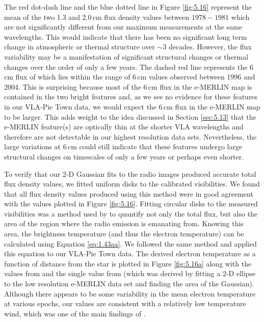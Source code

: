 The red dot-dash line and the blue dotted line in Figure \ref{fig:5.16} represent the mean of the two 1.3 and 2.0\,cm flux density values between $1978-1981$  \citep{newell_1982} which are not significantly different from our maximum measurements at the same wavelengths. This would indicate that there has been no significant long term change in atmospheric or thermal structure over $\sim 3$ decades. However, the flux variability may be a manifestation of significant structural changes or thermal changes over the order of only a few years. The dashed red line represents the 6\,cm flux of \cite{richards_2013} which lies within the range of 6\,cm values observed between 1996 and 2004. This is surprising because most of the 6\,cm flux in the e-MERLIN map is contained in the two bright features and, as we see no evidence for these features in our VLA-Pie Town data, we would expect the 6\,cm flux in the e-MERLIN map to be larger. This adds weight to the idea discussed in Section \ref{sec:5.13} that the e-MERLIN feature(s) are optically thin at the shorter VLA wavelengths and therefore are not detectable in our highest resolution data sets. Nevertheless, the large variations at 6\,cm could still indicate that these features undergo large structural changes on timescales of only a few years or perhaps even shorter.

To verify that our 2-D Gaussian fits to the radio images produced accurate total flux density values, we fitted uniform disks to the calibrated visibilities. We found that all flux density values produced using this method were in good agreement with the values plotted in Figure \ref{fig:5.16}. Fitting circular disks to the measured visibilities was a method used by \cite{lim_1998} to quantify not only the total flux, but also the area of the region where the radio emission is emanating from. Knowing this area, the brightness temperature (and thus the electron temperature) can be calculated using Equation \ref{eq:1.43aa}. We followed the same method and applied this equation to our VLA-Pie Town data. The derived electron temperature as a function of distance from the star is plotted in Figure \ref{fig:5.16a} along with the values from \cite{lim_1998} and the single value from \cite{richards_2013} (which was derived by fitting a 2-D ellipse to the low resolution e-MERLIN data set and finding the area of the Gaussian). Although there appears to be some variability in the mean electron temperature at various epochs, our values are consistent with a relatively low temperature wind, which was one of the main findings of \cite{lim_1998}. 

